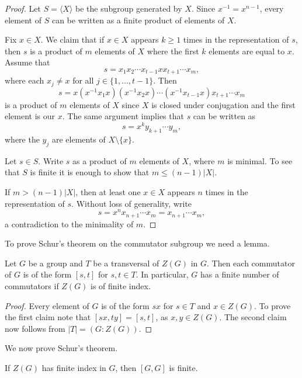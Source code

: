 \begin{proof}
	Let $S=\langle X\rangle$ be the subgroup generated by $X$. Since $x^{-1}=x^{n-1}$, every element 
	of $S$ can be written as a finite product of elements of $X$. 
	
	Fix $x\in X$. We claim that if $x\in X$ appears $k\geq 1$ times in the representation of $s$, then 
	$s$ is a product of $m$
	elements of $X$ where the first $k$ elements are equal to $x$. Assume that 
	\[
	s=x_1x_2\cdots x_{t-1}xx_{t+1}\cdots x_m,
	\]
	where each $x_j\ne x$ for all $j\in\{1,\dots,t-1\}$. Then 
	\[
		s=x(x^{-1}x_1x)(x^{-1}x_2x)\cdots (x^{-1}x_{t-1}x)x_{t+1}\cdots x_m
	\]
	is a product of $m$ elements of $X$ since $X$ is closed under conjugation and
	the first element is our $x$. The same argument implies that $s$
	can be written as 
	\[
		s=x^ky_{k+1}\cdots y_m,
	\]
	where the $y_j$ are elements of $X\setminus\{x\}$.

	Let $s\in S$. Write $s$ as a product of $m$ elements of $X$,
	where $m$ is minimal. To see that $S$ is finite it is enough to show that  
	$m\leq (n-1)|X|$. 
	
	If $m>(n-1)|X|$, then 
	at least one $x\in X$ appears $n$ times in the representation of $s$. Without loss of generality, write
	\[
		s=x^nx_{n+1}\cdots x_m=x_{n+1}\cdots x_m,
	\]
	a contradiction to the minimality of $m$. 
\end{proof}

To prove Schur's theorem on the commutator subgroup we need a lemma.

\begin{lemma}
	\label{lemma:[s,t]} 
	Let $G$ be a group and $T$ be a transversal of $Z(G)$ in
	$G$. Then each commutator of $G$ is of the form $[s,t]$ for $s,t\in T$. In particular, 
	$G$ has a finite number of commutators if $Z(G)$ is of finite index. 
\end{lemma}

\begin{proof}
	Every element of $G$ is of the form $sx$ for $s\in T$ and $x\in
	Z(G)$. To prove the first claim note that 
	$[sx,ty]=[s,t]$, 
	as $x,y\in Z(G)$. The second claim now follows from	$|T|=(G:Z(G))$.
\end{proof}

We now prove Schur's theorem. 

\begin{theorem}[Schur]
	\label{theorem:Schur_commutador}
	If $Z(G)$ has finite index in $G$, then $[G,G]$ is finite. 
\end{theorem}

